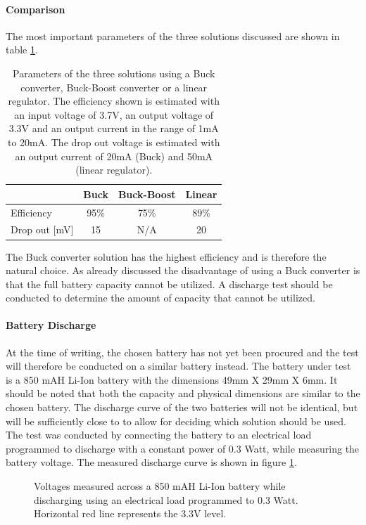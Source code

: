 \paragraph{Comparison}
The most important parameters of the three solutions discussed are shown in table \ref{tab:vol_gen_joint}.

\begin{table}[h]
	\centering
	\begin{tabular}{l|c|c|c}
		  				&	Buck 	& Buck-Boost 	& Linear\\
		 \hline
		 Efficiency  	&  95\% 	& 75\%			&89\%		\\
		 Drop out [mV]		&15  	& N/A		&20		\\
	\end{tabular}
	\caption[Parameters of voltage generation solutions.]{Parameters of the three solutions using a Buck converter, Buck-Boost converter or a linear regulator. The efficiency shown is estimated with an input voltage of 3.7V, an output voltage of 3.3V and an output current in the range of 1mA to 20mA. The drop out voltage is estimated with an output current of 20mA (Buck) and 50mA (linear regulator).}
	\label{tab:vol_gen_joint}
\end{table}

The Buck converter solution has the highest efficiency and is therefore the natural choice.
As already discussed the disadvantage of using a Buck converter is that the full battery capacity cannot be utilized.
A discharge test should be conducted to determine the amount of capacity that cannot be utilized.


\paragraph{Battery Discharge}
At the time of writing, the chosen battery has not yet been procured and the test will therefore be conducted on a similar battery instead.
The battery under test is a 850 mAH Li-Ion battery with the dimensions 49mm X 29mm X 6mm.
It should be noted that both the capacity and physical dimensions are similar to the chosen battery.
The discharge curve of the two batteries will not be identical, but will be sufficiently close to to allow for deciding which solution should be used.
The test was conducted by connecting the battery to an electrical load programmed to discharge with a constant power of 0.3 Watt, while measuring the battery voltage.
The measured discharge curve is shown in figure \ref{fig:bat_discharge}.

\begin{figure}[h]
	\centering
	\caption[Discharge curve of Li-Ion battery.]{Voltages measured across a 850 mAH Li-Ion battery while discharging using an electrical load programmed to 0.3 Watt. Horizontal red line represents the 3.3V level.}
	\label{fig:bat_discharge}
\end{figure}

